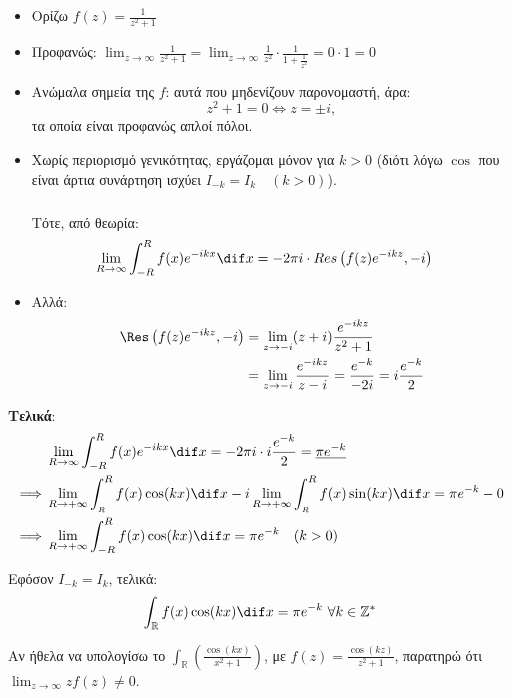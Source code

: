 \documentclass[12pt,a4paper,notitlepage,fleqn]{article}
\begin{document}
    \begin{itemize}
    	\item Ορίζω \( \displaystyle f(z) = \frac{1}{z^2+1} \)
    	\item Προφανώς: \( 
    	\displaystyle
    	\lim_{z\to \infty} \frac{1}{z^2+1} = \lim_{z\to \infty}\frac{1}{z^2}
    	\cdot \frac{1}{1+\frac{1}{z^2}} = 0\cdot 1 = 0
    	 \)
    	\item Ανώμαλα σημεία της \( f \): αυτά που μηδενίζουν παρονομαστή, άρα:
    	\[
    	z^2+1 = 0 \iff \boxed{z = \pm i},
    	\]
    	τα οποία είναι προφανώς απλοί πόλοι.
    	\item Χωρίς περιορισμό γενικότητας, εργάζομαι μόνον για \( k>0 \) (διότι λόγω
    	\( \cos \) που είναι άρτια συνάρτηση ισχύει \( I_{-k} = I_k \quad (k>0) \)).
    	
    	\subparagraph{}
    	Τότε, από θεωρία:
    	\begin{align*}
    	\lim_{R\to \infty} \int_{-R}^{R} f(x) e^{-ikx} \dif x &=
    	-2\pi i \cdot Res\left(
    	f(z)e^{-ikz}
    	, -i \right)
    	\end{align*}
    	
    	\item Αλλά:
    	\begin{align*}
    	\Res \left(
    	f(z)e^{-ikz},-i
    	\right) &= \lim_{z\to -i} (z+i)\frac{e^{-ikz}}{z^2+1}
    	\\ &= \lim_{z\to -i} \frac{e^{-ikz}}{z-i} = \frac{e^{-k}}{-2i} = i\frac{e^{-k}}{2}
    	 \end{align*}
    \end{itemize}
    
    \textbf{Τελικά}:
    \begin{align*}
    & \lim_{R\to \infty} \int_{-R}^{R} f(x)e^{-ikx} \dif x = -2\pi i\cdot i\frac{e^{-k}}{2}
    = \underline{\pi e^{-k}}
    \\ \implies & \lim_{R\to + \infty} \int_{_R}^{R} f(x) \cos(kx)\dif x
    - i \lim_{R\to +\infty} \int_{_R}^{R} f(x)\sin(kx)\dif x
    = \pi e^{-k} - 0
    \\ \implies & \lim_{R\to +\infty} \int_{-R}^{R} f(x)\cos(kx)\dif x = \pi e^{-k}
    \quad (k > 0)
    \end{align*}

    Εφόσον \( I_{-k} = I_k \), τελικά:
    \[
    \int_{\mathbb{R}} f(x)\cos(kx)\dif x = \pi e^{-k} \ \forall k\in\mathbb{Z}^*
    \]
    
    Αν ήθελα να υπολογίσω το \( \int_{\mathbb R} \left(\frac{\cos(kx)}{x^2+1}\right) \), με
    \( f(z) = \frac{\cos(kz)}{z^2+1} \), παρατηρώ ότι \( \displaystyle \lim_{z\to \infty}
    zf(z) \neq 0
     \).
     
\end{document}
